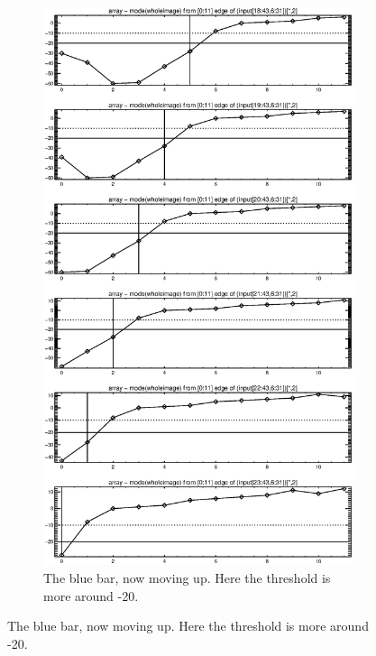 \documentclass[10pt]{article}
\begin{document}
\begin{figure}[!h]
    \centering 
    \hspace{-1.0in}
    \begin{subfigure}[b]{.4\linewidth}
        \centering
        \includegraphics[width=1.4\textwidth]{../plots_tables_images/botleft2.eps} 
        \caption{The blue bar, now moving up. Here the threshold is more around -20. \\}
    \end{subfigure}

\end{figure}
\end{document}
